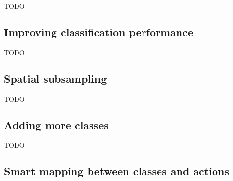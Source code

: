 TODO


\subsection{Improving classification performance}
\label{subsec:online_bci_system_different_common_steps_better_classi} 



TODO


\subsection{Spatial subsampling}
\label{subsec:online_bci_system_different_common_steps_subsampling} 

TODO


\subsection{Adding more classes}
\label{subsec:online_bci_system_different_common_steps_more_classs} 

TODO


\subsection{Smart mapping between classes and actions}
\label{subsec:online_bci_system_different_common_steps_mapping} 



